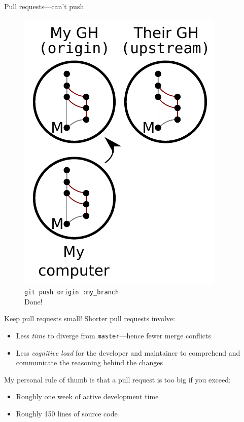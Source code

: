 \begin{frame}{Pull requests---can't push}
  \begin{figure}
    \includegraphics{fork_018.pdf}
    \\ \texttt{git push origin :my\_branch}
    \\ Done!
  \end{figure}
\end{frame}

\begin{frame}{Keep pull requests small!}
  Shorter pull requests involve:

  \begin{itemize}
    \item Less \emph{time} to diverge from \texttt{master}---hence
          fewer merge conflicts
    \item Less \emph{cognitive load} for the developer and maintainer
          to comprehend and communicate the reasoning behind the
          changes
  \end{itemize}

  My personal rule of thumb is that a pull request is too big if you exceed:

  \begin{itemize}
    \item Roughly one week of active development time
    \item Roughly 150 lines of source code
  \end{itemize}
\end{frame}

